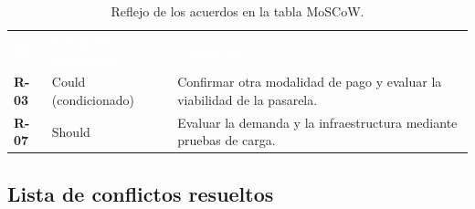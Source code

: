 \documentclass[12pt,a4paper]{article}
\newcommand{\cabecera}[1]{
    \textcolor{white}{\textbf{#1}}
}
\begin{document}
\begin{table}[H]
    \centering
    \small

    \begin{tabularx}{\textwidth}{C{1.2cm} L{4.3cm} Y}

        \cabecera{ID} &
        \cabecera{Categoría registrada} &
        \cabecera{Condición} \\

        \textbf{R-03} &
        Could (condicionado) &
        Confirmar otra modalidad de pago y evaluar la
        viabilidad de la pasarela. \\

        \textbf{R-07} &
        Should &
        Evaluar la demanda y la infraestructura mediante
        pruebas de carga. \\

        \bottomrule

    \end{tabularx}

    \caption{Reflejo de los acuerdos en la tabla MoSCoW.}
    \label{tab:reflejo-acuerdos}

\end{table}

\subsection{Lista de conflictos resueltos}

\begingroup

\small
\singlespacing
\setlength{\tabcolsep}{4pt}
\end{document}
